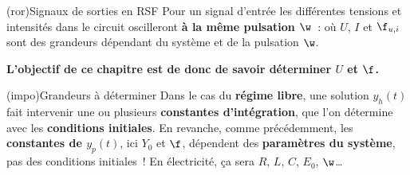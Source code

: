 \documentclass[../../main/main.tex]{subfiles}
\begin{document}
\begin{tcb}[label=prop:sortiersf](ror){Signaux de sorties en RSF}
	Pour un signal d'entrée
	\psw{%
		\[
			e(t) = E_0 \cos(\wt)
			\quad(\text{ou}\quad
			\eta(t) = \eta_0\cos(\wt))
		\]
	}%
	les différentes tensions et intensités dans le circuit oscilleront \textbf{à
		la même pulsation $\w$}~:
	\psw{%
		\[
			u(t) = U\cos(\wt+\f_u)
			\qet
			i(t) = I\cos(\wt+\f_i)
		\]
	}%
	où $U$, $I$ et $\f_{u,i}$ sont des grandeurs dépendant du système et de
	la pulsation $\w$.
	\begin{center}
		\bfseries
		L'objectif de ce chapitre est de donc de savoir déterminer $U$ et $\f$.
	\end{center}
\end{tcb}

\begin{tcb}[label=ror:CIounon](impo){Grandeurs à déterminer}
	Dans le cas du \textbf{régime libre}, une solution $y_h(t)$ fait intervenir une ou
	plusieurs \textbf{constantes d'intégration}, que l'on détermine avec les
	\textbf{conditions initiales}.
	\bigbreak
	En revanche, comme précédemment, les \textbf{constantes de $y_p(t)$}, ici
	$Y_0$ et $\f$, dépendent des \textbf{paramètres du système}, pas des
	conditions initiales~! En électricité, ça sera $R$, $L$, $C$, $E_0$, $\w$…
\end{tcb}


\end{document}
